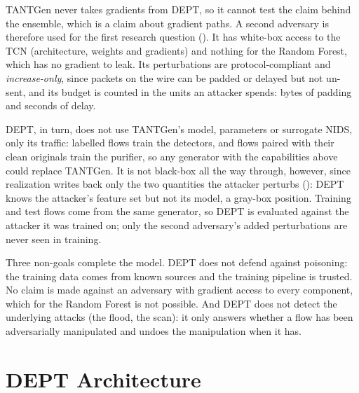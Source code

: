 \documentclass[acmtog,nonacm,pbalance]{acmart}
\begin{document}
TANTGen never takes gradients from DEPT, so it cannot test the claim behind the
ensemble, which is a claim about gradient paths. A second adversary is
therefore used for the first research question (). It has
white-box access to the TCN (architecture, weights and gradients) and nothing
for the Random Forest, which has no gradient to leak. Its perturbations are
protocol-compliant and \emph{increase-only}, since packets on the wire can be
padded or delayed but not un-sent, and its budget is counted in the units an
attacker spends: bytes of padding and seconds of delay.

DEPT, in turn, does not use TANTGen's model, parameters or surrogate NIDS, only
its traffic: labelled flows train the detectors, and flows paired with their
clean originals train the purifier, so any generator with the capabilities above
could replace TANTGen. It is not black-box all the way through, however, since
realization writes back only the two quantities the attacker perturbs
(): DEPT knows the attacker's feature set but
not its model, a gray-box position. Training and test flows come from the same
generator, so DEPT is evaluated against the attacker it was trained on; only the
second adversary's added perturbations are never seen in training.

Three non-goals complete the model. DEPT does not defend against poisoning: the
training data comes from known sources and the training pipeline is trusted. No
claim is made against an adversary with gradient access to every component,
which for the Random Forest is not possible. And DEPT does not detect the
underlying attacks (the flood, the scan): it only answers whether a flow has
been adversarially manipulated and undoes the manipulation when it has.

\section{DEPT Architecture}\label{sec:dept}
\end{document}
